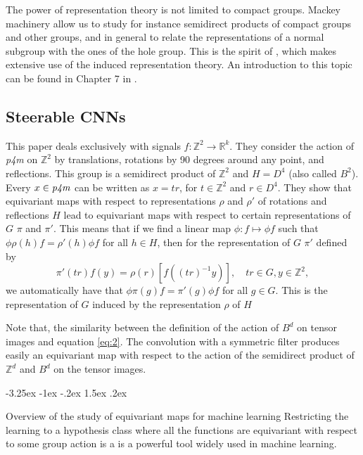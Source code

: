 \documentclass{article}
\makeatletter
\theoremstyle{definition}
\renewcommand\section{\@startsection {section}{1}{\z@}%
  {-3.25ex \@plus -1ex \@minus -.2ex}%
  {1.5ex \@plus .2ex}%
  {\raggedright\normalfont\large\bfseries}}%
\makeatother
\begin{document}
The power of representation theory is not limited to compact groups. Mackey machinery allow us to study for instance semidirect products of compact groups and other groups, and in general to relate the representations of a normal subgroup with the ones of the hole group. This is the spirit of \cite{ref4}, which makes extensive use of the induced representation theory. An introduction to this topic can be found in Chapter 7 in \cite{ref5}.

\subsection{Steerable CNNs}
This paper deals exclusively with signals $f: \mathbb{Z}^2 \to \mathbb{R}^k$. They consider the action of \textit{p4m} on $\mathbb{Z}^2$ by translations, rotations by 90 degrees around any point, and reflections. This group is a semidirect product of $\mathbb{Z}^2$ and $H= D^4$ (also called $B^2$). Every $x\in \text{\textit{p4m}}$ can be written as $x=tr$, for $t\in \mathbb{Z}^2$ and $r\in D^4$. They show that equivariant maps with respect to representations $\rho$ and $\rho'$ of rotations and reflections $H$ lead to equivariant maps with respect to certain representations of $G$ $\pi$ and $\pi'$. This means that if we find a linear map $\phi: f \mapsto \phi f$ such that $\phi \rho(h)f=\rho'(h)\phi f$ for all $h\in H$, then for the representation of $G$ $\pi'$ defined by
\begin{equation}\label{eq:2}
    \pi'(tr)f(y) = \rho(r) [f ((tr)^{-1}y)], \quad tr\in G, y \in \mathbb{Z}^2,
\end{equation}
we automatically have that $\phi \pi(g)f=\pi'(g)\phi f$ for all $g\in G$. This is the representation of $G$ induced by the representation $\rho$ of $H$

Note that, the similarity between the definition of the action of $B^d$ on tensor images and equation \eqref{eq:2}. The convolution with a symmetric filter produces easily an equivariant map with respect to  the action of the semidirect product of $\mathbb{Z}^d$ and $B^d$ on the tensor images. 

\section{Overview of the study of equivariant maps for machine learning}
Restricting the learning to a hypothesis class where all the functions are equivariant with respect to some group action is a is a powerful tool widely used in machine learning.
\end{document}
